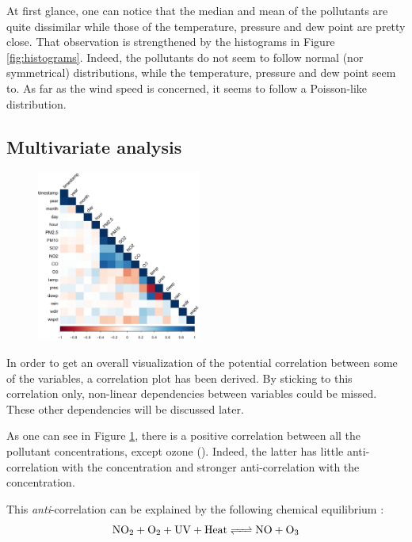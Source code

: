 \documentclass[a4paper, 12pt]{article}
\begin{document}
    At first glance, one can notice that the median and mean of the pollutants are quite dissimilar while those of the temperature, pressure and dew point are pretty close. That observation is strengthened by the histograms in Figure \ref{fig:histograms}. Indeed, the pollutants do not seem to follow normal (nor symmetrical) distributions, while the temperature, pressure and dew point seem to. As far as the wind speed is concerned, it seems to follow a Poisson-like distribution.
	\subsection{Multivariate analysis} \label{sec:multivariate_analysis}
	\begin{figure}
	    \vspace{-5em}
	    \centering
	    \includegraphics[width=0.48\textwidth]{resources/pdf/correlation.pdf}
	    \label{fig:corrplot}
	    \vspace{-3em}
	\end{figure}
	In order to get an overall visualization of the potential correlation between some of the variables, a correlation plot has been derived. By sticking to this correlation only, non-linear dependencies between variables could be missed. These other dependencies will be discussed later. \par
	As one can see in Figure \ref{fig:corrplot}, there is a positive correlation between all the pollutant concentrations, except ozone (). Indeed, the latter has little anti-correlation with the  concentration and stronger anti-correlation with the  concentration. \par
	This \emph{anti}-correlation can be explained by the following chemical equilibrium :
	\begin{equation}\label{eq:NO2_O3}
	    \ce{NO2 + O2 + UV + Heat <=> NO + O3}
	\end{equation}
\end{document}

